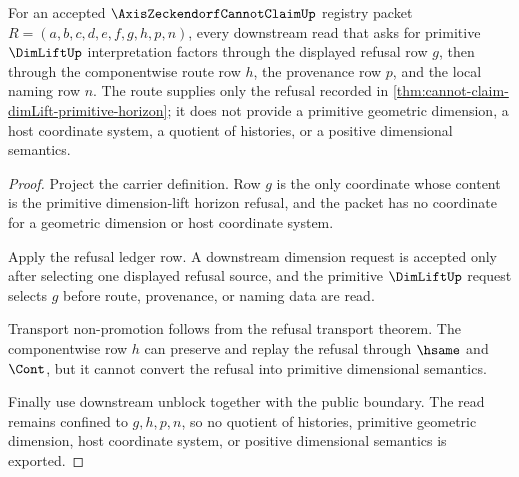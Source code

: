 \begin{theorem}
\label{thm:axis-zeckendorf-cannot-claim-dimlift-refusal-route}
For an accepted $\AxisZeckendorfCannotClaimUp$ registry packet $R=(a,b,c,d,e,f,g,h,p,n)$, every downstream read that asks for primitive $\DimLiftUp$ interpretation factors through the displayed refusal row $g$, then through the componentwise route row $h$, the provenance row $p$, and the local naming row $n$. The route supplies only the refusal recorded in \autoref{thm:cannot-claim-dimLift-primitive-horizon}; it does not provide a primitive geometric dimension, a host coordinate system, a quotient of histories, or a positive dimensional semantics.
\end{theorem}
\begin{proof}
Project the carrier definition. Row $g$ is the only coordinate whose content is the primitive dimension-lift horizon refusal, and the packet has no coordinate for a geometric dimension or host coordinate system.

Apply the refusal ledger row. A downstream dimension request is accepted only after selecting one displayed refusal source, and the primitive $\DimLiftUp$ request selects $g$ before route, provenance, or naming data are read.

Transport non-promotion follows from the refusal transport theorem. The componentwise row $h$ can preserve and replay the refusal through $\hsame$ and $\Cont$, but it cannot convert the refusal into primitive dimensional semantics.

Finally use downstream unblock together with the public boundary. The read remains confined to $g,h,p,n$, so no quotient of histories, primitive geometric dimension, host coordinate system, or positive dimensional semantics is exported.
\end{proof}

